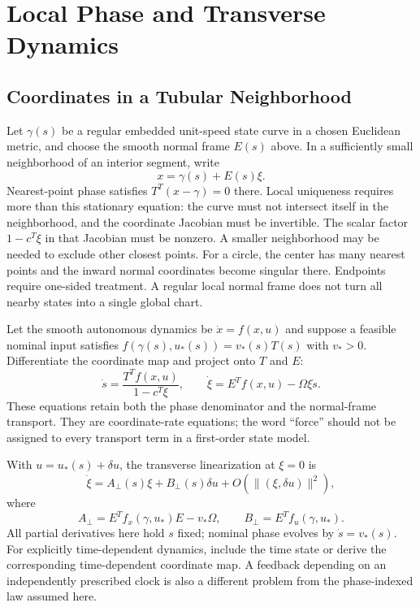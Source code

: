 \documentclass[12pt, openany]{book}
\theoremstyle{plain}
\begin{document}
\section{Local Phase and Transverse Dynamics}

\subsection{Coordinates in a Tubular Neighborhood}

Let $\gamma(s)$ be a regular embedded unit-speed state curve in a chosen
Euclidean metric, and choose the smooth normal frame $E(s)$ above. In a
sufficiently small neighborhood of an interior segment, write
\begin{equation}\label{eq:frenet_coords}
 x=\gamma(s)+E(s)\xi.
\end{equation}
Nearest-point phase satisfies $T^T(x-\gamma)=0$ there. Local uniqueness
requires more than this stationary equation: the curve must not intersect
itself in the neighborhood, and the coordinate Jacobian must be invertible.
The scalar factor $1-c^T\xi$ in that Jacobian must be nonzero. A smaller
neighborhood may be needed to exclude other closest points. For a circle,
the center has many nearest points and the inward normal coordinates become
singular there. Endpoints require one-sided treatment. A regular local
normal frame does not turn all nearby states into a single global chart.

Let the smooth autonomous dynamics be $\dot x=f(x,u)$ and suppose a feasible
nominal input satisfies
$f(\gamma(s),u_*(s))=v_*(s)T(s)$ with $v_*>0$. Differentiate the coordinate
map and project onto $T$ and $E$:
\begin{equation}\label{eq:curve_exact_transverse}
 \dot s=\frac{T^Tf(x,u)}{1-c^T\xi},\qquad
 \dot\xi=E^Tf(x,u)-\Omega\xi\dot s.
\end{equation}
These equations retain both the phase denominator and the normal-frame
transport. They are coordinate-rate equations; the word ``force'' should
not be assigned to every transport term in a first-order state model.

With $u=u_*(s)+\delta u$, the transverse linearization at $\xi=0$ is
\begin{equation}\label{eq:transverse_lin}
 \dot\xi=A_\perp(s)\xi+B_\perp(s)\delta u
 +O(\|(\xi,\delta u)\|^2),
\end{equation}
where
\begin{equation}
 A_\perp=E^Tf_x(\gamma,u_*)E-v_*\Omega,
 \qquad B_\perp=E^Tf_u(\gamma,u_*).
\end{equation}
All partial derivatives here hold $s$ fixed; nominal phase evolves by
$\dot s=v_*(s)$. For explicitly time-dependent dynamics, include the time
state or derive the corresponding time-dependent coordinate map. A
feedback depending on an independently prescribed clock is also a different
problem from the phase-indexed law assumed here.
\end{document}
